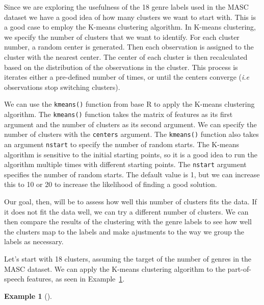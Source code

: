 \documentclass[
  letterpaper,
  DIV=11,
  numbers=noendperiod]{scrreport}
\newenvironment{Shaded}{\begin{snugshade}}{\end{snugshade}}
\newcommand{\AttributeTok}[1]{\textcolor[rgb]{0.00,0.00,0.00}{#1}}
\newcommand{\CommentTok}[1]{\textcolor[rgb]{0.00,0.00,0.00}{\textit{#1}}}
\newcommand{\DecValTok}[1]{\textcolor[rgb]{0.00,0.00,0.00}{#1}}
\newcommand{\FunctionTok}[1]{\textcolor[rgb]{0.00,0.00,0.00}{#1}}
\newcommand{\NormalTok}[1]{\textcolor[rgb]{0.00,0.00,0.00}{#1}}
\newcommand{\OtherTok}[1]{\textcolor[rgb]{0.00,0.00,0.00}{#1}}
\newcommand{\SpecialCharTok}[1]{\textcolor[rgb]{0.00,0.00,0.00}{#1}}
\theoremstyle{definition}
\newtheorem{example}{Example}[chapter]
\theoremstyle{remark}
\begin{document}
Since we are exploring the usefulness of the 18 genre labels used in the
MASC dataset we have a good idea of how many clusters we want to start
with. This is a good case to employ the K-means clustering algorithm. In
K-means clustering, we specify the number of clusters that we want to
identify. For each cluster number, a random center is generated. Then
each observation is assigned to the cluster with the nearest center. The
center of each cluster is then recalculated based on the distribution of
the observations in the cluster. This process is iterates either a
pre-defined number of times, or until the centers converge (\emph{i.e}
observations stop switching clusters).

We can use the \texttt{kmeans()} function from base R to apply the
K-means clustering algorithm. The \texttt{kmeans()} function takes the
matrix of features as its first argument and the number of clusters as
its second argument. We can specify the number of clusters with the
\texttt{centers} argument. The \texttt{kmeans()} function also takes an
argument \texttt{nstart} to specify the number of random starts. The
K-means algorithm is sensitive to the initial starting points, so it is
a good idea to run the algorithm multiple times with different starting
points. The \texttt{nstart} argument specifies the number of random
starts. The default value is 1, but we can increase this to 10 or 20 to
increase the likelihood of finding a good solution.

Our goal, then, will be to assess how well this number of clusters fits
the data. If it does not fit the data well, we can try a different
number of clusters. We can then compare the results of the clustering
with the genre labels to see how well the clusters map to the labels and
make ajustments to the way we group the labels as necessary.

Let's start with 18 clusters, assuming the target of the number of
genres in the MASC dataset. We can apply the K-means clustering
algorithm to the part-of-speech features, as seen in
Example~\ref{exm-eda-masc-pos-kmeans}.

\begin{example}[]\protect\hypertarget{exm-eda-masc-pos-kmeans}{}\label{exm-eda-masc-pos-kmeans}

~

\begin{Shaded}
\end{Shaded}

\end{example}
\end{document}
